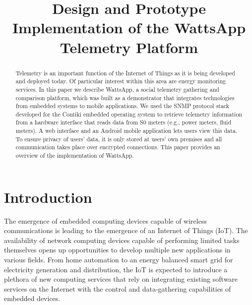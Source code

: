 \documentclass[10pt, conference, compsocconf, english]{IEEEtran}
\begin{document}
\author{
\IEEEauthorblockN{\\\\\\\\\\\\}
}


\title{Design and Prototype Implementation of the WattsApp Telemetry Platform}

\maketitle
\begin{abstract}
Telemetry is an important function of the Internet of Things as it
is being developed and deployed today. Of particular interest within
this area are energy monitoring services. In this paper we describe
WattsApp, a social telemetry gathering and comparison platform, which
was built as a demonstrator that integrates technologies from embedded
systems to mobile applications. We used the SNMP protocol stack developed
for the Contiki embedded operating system to retrieve telemetry information
from a hardware interface that reads data from S0 meters (e.g., power
meters, fluid meters). A web interface and an Android mobile application
lets users view this data. To ensure privacy of users' data, it is
only stored at users' own premises and all communication takes place
over encrypted connections. This paper provides an overview of the
implementation of WattsApp. 
\end{abstract}

\section{Introduction}

The emergence of embedded computing devices capable of wireless communications
is leading to the emergence of an Internet of Things (IoT). The availability
of network computing devices capable of performing limited tasks themselves
opens up opportunities to develop multiple new applications in various
fields. From home automation to an energy balanced smart grid for
electricity generation and distribution, the IoT is expected to introduce
a plethora of new computing services that rely on integrating existing
software services on the Internet with the control and data-gathering
capabilities of embedded devices.
\end{document}

